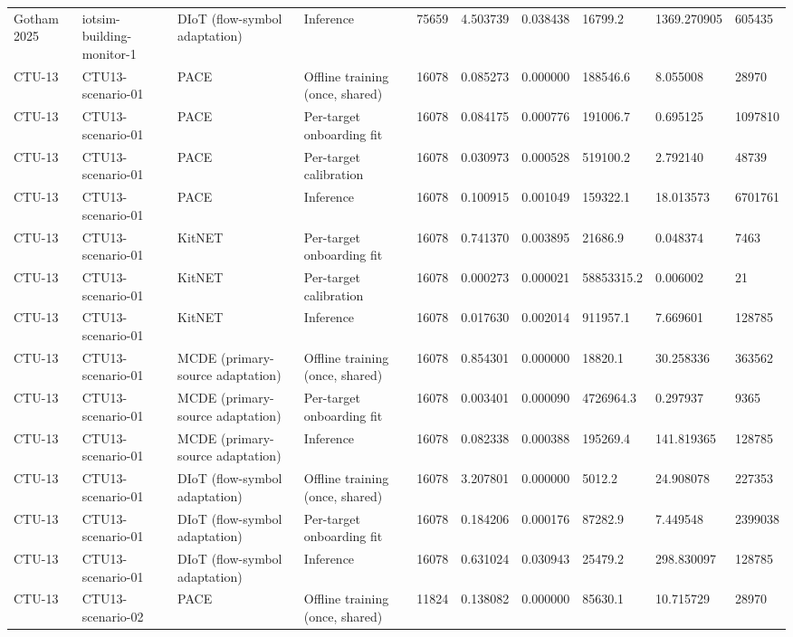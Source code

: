 \begin{tabular}{llllllllll}
Gotham 2025 & iotsim-building-monitor-1 & DIoT (flow-symbol adaptation) & Inference & 75659 & 4.503739 & 0.038438 & 16799.2 & 1369.270905 & 605435 \\
CTU-13 & CTU13-scenario-01 & PACE & Offline training (once, shared) & 16078 & 0.085273 & 0.000000 & 188546.6 & 8.055008 & 28970 \\
CTU-13 & CTU13-scenario-01 & PACE & Per-target onboarding fit & 16078 & 0.084175 & 0.000776 & 191006.7 & 0.695125 & 1097810 \\
CTU-13 & CTU13-scenario-01 & PACE & Per-target calibration & 16078 & 0.030973 & 0.000528 & 519100.2 & 2.792140 & 48739 \\
CTU-13 & CTU13-scenario-01 & PACE & Inference & 16078 & 0.100915 & 0.001049 & 159322.1 & 18.013573 & 6701761 \\
CTU-13 & CTU13-scenario-01 & KitNET & Per-target onboarding fit & 16078 & 0.741370 & 0.003895 & 21686.9 & 0.048374 & 7463 \\
CTU-13 & CTU13-scenario-01 & KitNET & Per-target calibration & 16078 & 0.000273 & 0.000021 & 58853315.2 & 0.006002 & 21 \\
CTU-13 & CTU13-scenario-01 & KitNET & Inference & 16078 & 0.017630 & 0.002014 & 911957.1 & 7.669601 & 128785 \\
CTU-13 & CTU13-scenario-01 & MCDE (primary-source adaptation) & Offline training (once, shared) & 16078 & 0.854301 & 0.000000 & 18820.1 & 30.258336 & 363562 \\
CTU-13 & CTU13-scenario-01 & MCDE (primary-source adaptation) & Per-target onboarding fit & 16078 & 0.003401 & 0.000090 & 4726964.3 & 0.297937 & 9365 \\
CTU-13 & CTU13-scenario-01 & MCDE (primary-source adaptation) & Inference & 16078 & 0.082338 & 0.000388 & 195269.4 & 141.819365 & 128785 \\
CTU-13 & CTU13-scenario-01 & DIoT (flow-symbol adaptation) & Offline training (once, shared) & 16078 & 3.207801 & 0.000000 & 5012.2 & 24.908078 & 227353 \\
CTU-13 & CTU13-scenario-01 & DIoT (flow-symbol adaptation) & Per-target onboarding fit & 16078 & 0.184206 & 0.000176 & 87282.9 & 7.449548 & 2399038 \\
CTU-13 & CTU13-scenario-01 & DIoT (flow-symbol adaptation) & Inference & 16078 & 0.631024 & 0.030943 & 25479.2 & 298.830097 & 128785 \\
CTU-13 & CTU13-scenario-02 & PACE & Offline training (once, shared) & 11824 & 0.138082 & 0.000000 & 85630.1 & 10.715729 & 28970 \\

\end{tabular}
